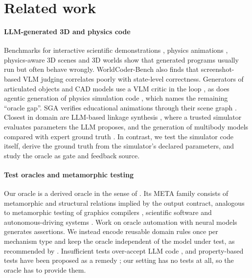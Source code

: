 \section{Related work}\label{sec:related}

\paragraph{LLM-generated 3D and physics code} Benchmarks for interactive scientific demonstrations \citep{chen2025interactscience}, physics animations \citep{wang2026simuscene}, physics-aware 3D scenes \citep{xie2026physcodebench} and 3D worlds \citep{lu2026worldcoder} show that generated programs usually run but often behave wrongly. WorldCoder-Bench also finds that screenshot-based VLM judging correlates poorly with state-level correctness. Generators of articulated objects and CAD models use a VLM critic in the loop \citep{gao2026lam,le2025articulate,alrashedy2025cad}, as does agentic generation of physics simulation code \citep{shende2026perceptual}, which names the remaining ``oracle gap''. SGA verifies educational animations through their scene graph \citep{lopez2026sga}. Closest in domain are LLM-based linkage synthesis \citep{gandarela2025msynth,gandarela2026linkage}, where a trusted simulator evaluates parameters the LLM proposes, and the generation of multibody models compared with expert ground truth \citep{gerstmayr2026meceng}. In contrast, we test the simulator code itself, derive the ground truth from the simulator's declared parameters, and study the oracle as gate and feedback source.

\paragraph{Test oracles and metamorphic testing} Our oracle is a derived oracle in the sense of \citet{barr2015oracle}. Its META family consists of metamorphic and structural relations \citep{chen2018metamorphic,segura2016survey} implied by the output contract, analogous to metamorphic testing of graphics compilers \citep{donaldson2017shader}, scientific software \citep{kanewala2014scientific} and autonomous-driving systems \citep{zhou2019driverless}. Work on oracle automation with neural models \citep{dinella2022toga,hossain2023neural,molina2025oracle} generates assertions. We instead encode reusable domain rules once per mechanism type and keep the oracle independent of the model under test, as recommended by \citet{molina2025oracle}. Insufficient tests over-accept LLM code \citep{liu2023evalplus}, and property-based tests have been proposed as a remedy \citep{vikram2023pbt}; our setting has no tests at all, so the oracle has to provide them.

